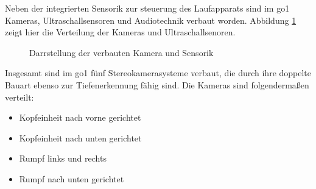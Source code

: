 Neben der integrierten Sensorik zur steuerung des Laufapparats sind im \gls{go1} Kameras, Ultraschallsensoren und
Audiotechnik verbaut worden.
Abbildung \ref{fig:kameras_sensorik} zeigt hier die Verteilung der Kameras und Ultraschallsenoren.

\begin{figure}[h]
    \caption{Darrstellung der verbauten Kamera und Sensorik}\label{fig:kameras_sensorik}
\end{figure}

Insgesamt sind im \gls{go1} fünf Stereokamerasysteme verbaut, die durch ihre doppelte Bauart ebenso zur Tiefenerkennung
fähig sind.
Die Kameras sind folgendermaßen verteilt:

\begin{itemize}
    \item {} Kopfeinheit nach vorne gerichtet
    \item {} Kopfeinheit nach unten gerichtet
    \item {} Rumpf links und rechts
    \item {} Rumpf nach unten gerichtet
\end{itemize}

